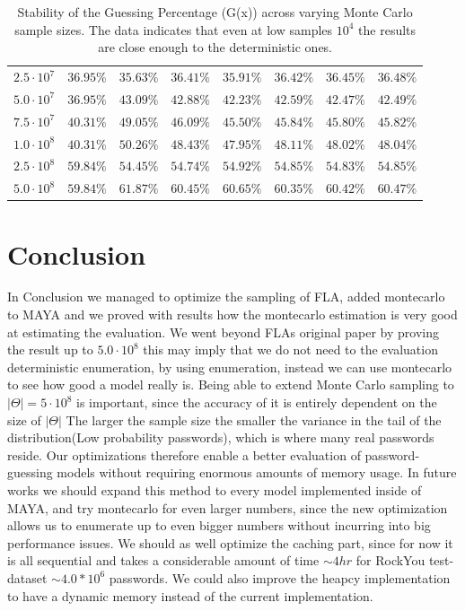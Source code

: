 \documentclass[english,noexaminfo,a4paper,oneside, binding = 0.6cm]{sapthesis}
\begin{document}
\begin{table}[htbp]
\begin{tabular}{l|r|r|r|r|r|r|r}
$2.5 \cdot 10^7$ & $36.95\%$ &$35.63\%$ & $36.41\%$ & $35.91\%$ & $36.42\%$ & $36.45\%$ & $36.48\%$ \\
\rowcolor{lightgray}
$5.0 \cdot 10^7$ & $36.95\%$ &$43.09\%$ & $42.88\%$ & $42.23\%$ & $42.59\%$ & $42.47\%$ & $42.49\%$ \\
$7.5 \cdot 10^7$ &$40.31\%$ & $49.05\%$ & $46.09\%$ & $45.50\%$ & $45.84\%$ & $45.80\%$ & $45.82\%$ \\
\rowcolor{lightgray}
$1.0 \cdot10^8$ & $40.31\%$ &$50.26\%$ & $48.43\%$ & $47.95\%$ & $48.11\%$ & $48.02\%$ & $48.04\%$ \\
$2.5 \cdot 10^8$ & $59.84\%$ &$54.45\%$ & $54.74\%$ & $54.92\%$ & $54.85\%$ & $54.83\%$ & $54.85\%$ \\
\rowcolor{lightgray}
$5.0 \cdot 10^8$ & $59.84\%$ &$61.87\%$ & $60.45\%$ & $60.65\%$ & $60.35\%$ & $60.42\%$ & $60.47\%$ \\
 \bottomrule
\end{tabular}
\caption{Stability of the Guessing Percentage (G(x)) across varying Monte Carlo sample
sizes. The data indicates that even at low samples $10^4$ the results are close enough to
the deterministic ones.}
\label{tab:2}
\end{table}

\chapter{Conclusion}
\label{chap:7}
In Conclusion we managed to optimize the sampling of FLA, added montecarlo to MAYA and we proved with results how the montecarlo estimation is very good at estimating the evaluation.
We went beyond FLAs original paper by proving the result up to $5.0 \cdot 10^8$ this may imply that we do not need to the evaluation deterministic enumeration, by using enumeration, instead we can use montecarlo to see how good a model really is.
Being able to extend Monte Carlo sampling to $|\Theta| = 5\cdot10^8$ is 
important, since the accuracy of it is entirely dependent on the size of $|\Theta|$ 
The larger the sample size the smaller the variance in the tail of the distribution(Low probability passwords), which is where many
real passwords reside. Our optimizations therefore enable a  better evaluation of password-guessing models without requiring 
enormous amounts of memory usage.
In future works we should expand this method to every model implemented inside of MAYA, and try montecarlo for even larger numbers, since the new optimization allows us to enumerate up to even bigger numbers without incurring into big performance issues.
We should as well optimize the caching part, since for now it is all sequential and takes a considerable amount of time $\sim 4hr$ for RockYou test-dataset $\sim 4.0*10^6$ passwords.
We could also improve the heapcy implementation to have a dynamic memory instead of the current implementation.
\end{document}
